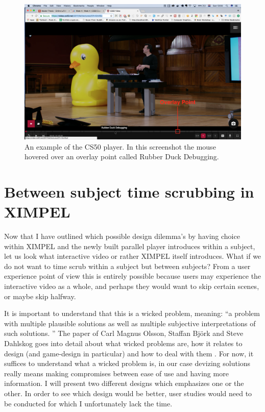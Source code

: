 \begin{figure}
\centering
\includegraphics[width=1.35\textwidth, center]{images/cs50_player.png} %
\caption{An example of the CS50 player. In this screenshot the mouse hovered over an overlay point called Rubber Duck Debugging.}
\label{images:cs50_player}
\end{figure}

\section{Between subject time scrubbing in XIMPEL}
Now that I have outlined which possible design dilemma's by having choice within XIMPEL and the newly built parallel player introduces within a subject, let us look what interactive video or rather XIMPEL itself introduces. What if we do not want to time scrub within a subject but between subjects? From a user experience point of view this is entirely possible because users may experience the interactive video as a whole, and perhaps they would want to skip certain scenes, or maybe skip halfway.

It is important to understand that this is a wicked problem, meaning: ``a problem with multiple plausible solutions as well as multiple subjective interpretations of such solutions. \cite{olsson2014}'' The paper of Carl Magnus Olsson, Staffan Björk and Steve Dahlskog goes into detail about what wicked problems are, how it relates to design (and game-design in particular) and how to deal with them \cite{olsson2014}. For now, it suffices to understand what a wicked problem is, in our case devizing solutions really means making compromises between ease of use and having more information. I will present two different designs which emphasizes one or the other. In order to see which design would be better, user studies would need to be conducted for which I unfortunately lack the time.

